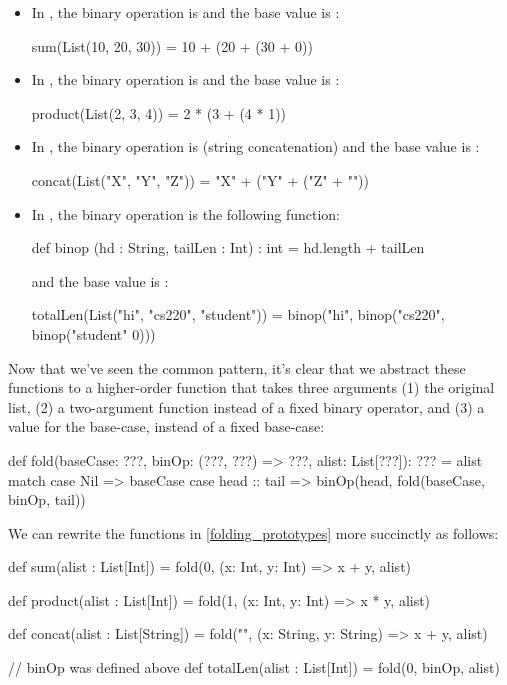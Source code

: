 \documentclass[9pt]{extbook}
\begin{document}
\begin{itemize}

\item In , the binary operation is \scalainline{+}
and the base value is :
\begin{scalacode}
sum(List(10, 20, 30)) = 10 + (20 + (30 + 0))
\end{scalacode}

\item In , the binary operation is \scalainline{*}
and the base value is :
\begin{scalacode}
product(List(2, 3, 4)) = 2 * (3 + (4 * 1))
\end{scalacode}

\item In , the binary operation is \scalainline{+} (string
concatenation) and the base value is :
\begin{scalacode}
concat(List("X", "Y", "Z")) = "X" + ("Y" + ("Z" + ""))
\end{scalacode}

\item In , the binary operation is the following
function:
\begin{scalacode}
def binop (hd : String, tailLen : Int) : int = hd.length + tailLen
\end{scalacode}
and the base value is :
\begin{scalacode}
totalLen(List("hi", "cs220", "student")) = binop("hi", binop("cs220", binop("student" 0)))
\end{scalacode}

\end{itemize}

Now that we've seen the common pattern, it's clear that we abstract
these functions to a higher-order
function that takes three arguments (1) the original list, (2)
a two-argument function instead of a fixed binary operator, and (3) a
value for the base-case, instead of a fixed base-case:
%
\begin{scalacode}
def fold(baseCase: ???, binOp: (???, ???) => ???, alist: List[???]): ??? = alist match {
  case Nil => baseCase
  case head :: tail => binOp(head, fold(baseCase, binOp, tail))
}
\end{scalacode}

We can rewrite the functions in \cref{folding_prototypes} more
succinctly as follows:
%
\begin{scalacode}
def sum(alist : List[Int]) = fold(0, (x: Int, y: Int) => x + y, alist)

def product(alist : List[Int]) = fold(1, (x: Int, y: Int) => x * y, alist)

def concat(alist : List[String]) = fold("", (x: String, y: String) => x + y, alist)

// binOp was defined above
def totalLen(alist : List[Int]) = fold(0, binOp, alist)
\end{scalacode}
\end{document}
